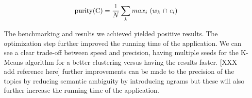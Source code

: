 \begin{equation}
	\text{purity(C)} = {{1 \over N}  \sum_k \textrm{$max_i$ ($w_k$ $\cap$ $c_i$)}}
\end{equation}

The benchmarking and results we achieved yielded positive results. The optimization step further improved the running time of the application. We can see a clear trade-off between speed and precision, having multiple seeds for the K-Means algorithm for a better clustering versus having the results faster. [XXX add reference here] further improvements can be made to the precision of the topics by reducing semantic ambiguity by introducing ngrams but these will also further increase the running time of the application.
